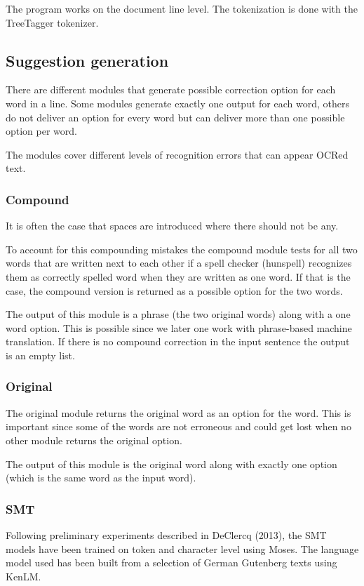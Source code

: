 \documentclass[letterpaper,10pt,english]{sphinxmanual}
\begin{document}
The program works on the document line level. The tokenization is done with the TreeTagger tokenizer.


\subsection{Suggestion generation}
\label{\detokenize{README:suggestion-generation}}
There are different modules that generate possible correction option for each word in a line. Some modules
generate exactly one output for each word, others do not deliver an option for every word but can deliver more than one
possible option per word.

The modules cover different levels of recognition errors that can appear OCRed text.


\subsubsection{Compound}
\label{\detokenize{README:compound}}
It is often the case that spaces are introduced where there should not be any.

To account for this compounding mistakes the compound module tests for all two words that are written next to each other if a
spell checker (hunspell) recognizes them as correctly spelled word when they are written as one word. If that is the case, the
compound version is returned as a possible option for the two words.

The output of this module is a phrase (the two original words) along with a one word option. This is possible since we later one work
with phrase-based machine translation. If there is no compound correction in the input sentence the output is an empty list.


\subsubsection{Original}
\label{\detokenize{README:original}}
The original module returns the original word as an option for the word. This is important since some of the words are not
erroneous and could get lost when no other module returns the original option.

The output of this module is the original word along with exactly one option (which is the same word as the input word).


\subsubsection{SMT}
\label{\detokenize{README:smt}}
Following preliminary experiments described in DeClercq (2013), the SMT models have been trained on token and character level using Moses. The language model used has been built from a selection of German Gutenberg texts using KenLM.
\end{document}
